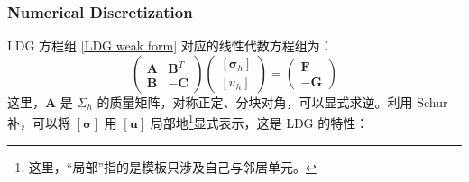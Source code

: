 \subsubsection{Numerical Discretization}

LDG 方程组 \eqref{LDG weak form} 对应的线性代数方程组为：
\begin{equation}\label{LDG linear equations}
	\begin{pmatrix}
		\bm A & \bm B^T \\
		\bm B & -\bm C
	\end{pmatrix}
	\begin{pmatrix}
		[\bm\sigma_{h}] \\
		[u_{h}]
	\end{pmatrix}
	= \begin{pmatrix}
		\bm F \\
		-\bm G
	 \end{pmatrix}
\end{equation}
这里，\(\bm A\) 是 \(\Sigma_{h}\) 的质量矩阵，对称正定、分块对角，可以显式求逆。利用 Schur 补，可以将 \([\bm\sigma]\) 用 \([\bm u]\) 局部地\footnote{这里，“局部”指的是模板只涉及自己与邻居单元。}显式表示，这是 LDG 的特性：

